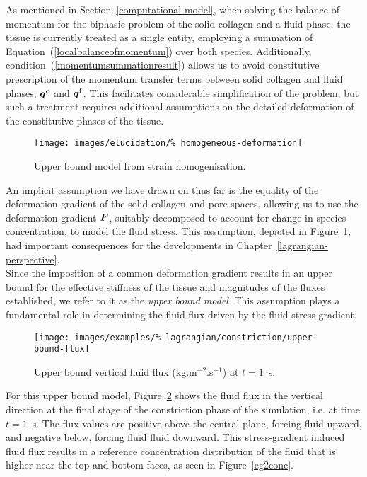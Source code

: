 As mentioned in Section~\ref{computational-model}, when solving the
balance of momentum for the biphasic problem of the solid collagen and
a fluid phase, the tissue is currently treated as a single entity,
employing a summation of Equation~(\ref{localbalanceofmomentum}) over
both species. Additionally, condition~(\ref{momentumsummationresult})
allows us to avoid constitutive prescription of the momentum transfer
terms between solid collagen and fluid phases, $\mbox{\boldmath$ q$}^\mathrm{c}$ and
$\mbox{\boldmath$ q$}^\mathrm{f}$. This facilitates considerable simplification of the
problem, but such a treatment requires additional assumptions on the
detailed deformation of the constitutive phases of the tissue.

\begin{figure}[!hpt]
  \centering
  \texttt{[image: images/elucidation/\%
    homogeneous-deformation]}
  \caption{Upper bound model from strain homogenisation.}
  \label{upper-bound-model}
\end{figure}

An implicit assumption we have drawn on thus far is the equality of
the deformation gradient of the solid collagen and pore spaces,
allowing us to use the deformation gradient $\mbox{\boldmath$ F$}$, suitably decomposed
to account for change in species concentration, to model the fluid
stress. This assumption, depicted in Figure~\ref{upper-bound-model},
had important consequences for the developments in
Chapter~\ref{lagrangian-perspective}.\\ %

Since the imposition of a common deformation gradient results in an
upper bound for the effective stiffness of the tissue and magnitudes
of the fluxes established, we refer to it as the {\em upper bound
  model}. This assumption plays a fundamental role in determining the
fluid flux driven by the fluid stress gradient.

\begin{figure}[!t]
  \centering
  \texttt{[image: images/examples/\%
    lagrangian/constriction/upper-bound-flux]}
  \caption{Upper bound vertical fluid flux (kg.m$^{-2}$.s$^{-1}$) at
    $t=1$~s.}
  \label{eg2flux}
\end{figure}

\noindent For this upper bound model, Figure~\ref{eg2flux} shows the
fluid flux in the vertical direction at the final stage of the
constriction phase of the simulation, i.e. at time $t=1$~s. The flux
values are positive above the central plane, forcing fluid upward, and
negative below, forcing fluid fluid downward. This stress-gradient
induced fluid flux results in a reference concentration distribution
of the fluid that is higher near the top and bottom faces, as seen in
Figure~\ref{eg2conc}.

